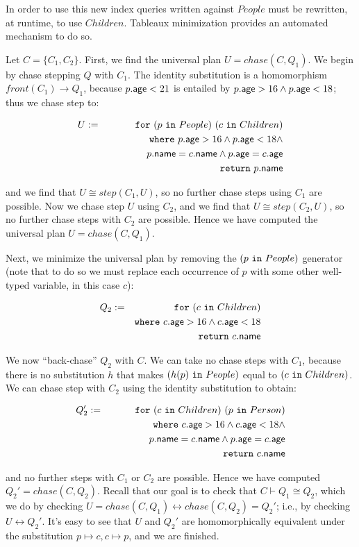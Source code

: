 \documentclass[preprint]{sigplanconf}
\newcommand{\FOR}{{\tt for} \ }
\newcommand{\WHERE}{{\tt where} \ }
\newcommand{\IN}{ \ {\tt in} \ }
\newcommand{\RETURN}{{\tt return} \ }
\begin{document}
In order to use this new index queries written against $People$ must be rewritten, at runtime, to use $Children$.  Tableaux minimization provides an automated mechanism to do so. 

Let $C = \{ C_1, C_2\}$.  First, we find the universal plan $U = chase(C, Q_1)$.  We begin by chase stepping $Q$ with $C_1$.  The identity substitution is a homomorphism $front(C_1) \to Q_1$, because $p.{\sf age} < 21$ is entailed by $p.{\sf age} > 16 \wedge p.{\sf age} < 18$; thus we chase step to:
\begin{normalsize}
\begin{eqnarray*}
U & := & \FOR (p \IN People) \ (c \IN Children) \\
 & & \WHERE p.{\sf age} > 16 \wedge p.{\sf age} < 18 \wedge \\
 & & \ \ \ \ \ \ \ \ \ \ \ \ p.{\sf name} = c.{\sf name} \wedge p.{\sf age} = c.{\sf age} \\
 & & \RETURN p.{\sf name}
\end{eqnarray*}  
\end{normalsize}
and we find that $U \cong step(C_1, U)$, so no further chase steps using $C_1$ are possible.  Now we chase step $U$ using $C_2$, and we find that $U \cong step(C_2, U)$, so no further chase steps with $C_2$ are possible.  Hence we have computed the universal plan $U = chase(C,Q_1)$.

Next, we minimize the universal plan by removing the $(p \IN People)$ generator (note that to do so we must replace each occurrence of $p$ with some other well-typed variable, in this case $c$):
\begin{normalsize}
\begin{eqnarray*}
Q_2 & := & \FOR (c \IN Children) \\
 & & \WHERE c.{\sf age} > 16 \wedge c.{\sf age} < 18 \\
  & & \RETURN c.{\sf name}
\end{eqnarray*}  
\end{normalsize}
We now ``back-chase'' $Q_2$ with $C$.  We can take no chase steps with $C_1$, because there is no substitution $h$ that makes $(h(p) \IN People)$ equal to $(c \IN Children)$.  We can chase step with $C_2$ using the identity substitution to obtain:
\begin{normalsize}
\begin{eqnarray*}
Q_2' & := & \FOR (c \IN Children) \ (p \IN Person) \\
 & & \WHERE c.{\sf age} > 16 \wedge c.{\sf age} < 18 \wedge \\
 & & \ \ \ \ \ \ \ \ \ \ \ \   p.{\sf name} = c.{\sf name} \wedge p.{\sf age} = c.{\sf age}\\
  & & \RETURN c.{\sf name}
\end{eqnarray*}  
\end{normalsize}
and no further steps with $C_1$ or $C_2$ are possible. Hence we have computed $Q_2' = chase(C, Q_2)$.  Recall that our goal is to check that $C \vdash Q_1 \cong Q_2$, which we do by checking $U = chase(C, Q_1) \leftrightarrow chase(C, Q_2) = Q_2'$; i.e., by checking $U \leftrightarrow Q_2'$.  It's easy to see that $U$ and $Q_2'$ are homomorphically equivalent under the substitution $p \mapsto c, c \mapsto p$, and we are finished.   
\end{document}
